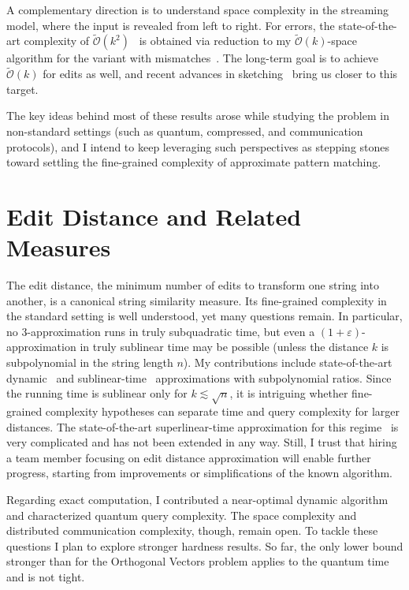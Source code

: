 \documentclass[a4paper,11pt]{article}
\newcommand{\eps}{\varepsilon}
\newcommand{\Ohtilde}{\tilde{\mathcal{O}}}
\begin{document}
A complementary direction is to understand space complexity in the streaming model, where the input is revealed from left to right. 
For errors, the state-of-the-art complexity of $\Ohtilde(k^2)$~\cite{BK23b} is obtained via reduction to my $\Ohtilde(k)$-space algorithm for the variant with mismatches~\cite{CKP19}. 
The long-term goal is to achieve $\Ohtilde(k)$ for edits as well, and recent advances in sketching~\cite{KS24} bring us closer to this target.  

The key ideas behind most of these results arose while studying the problem in non-standard settings (such as quantum, compressed, and communication protocols), and I intend to keep leveraging such perspectives as stepping stones toward settling the fine-grained complexity of approximate pattern matching.

\section{Edit Distance and Related Measures}

The edit distance, the minimum number of edits to transform one string into another, is a canonical string similarity measure. 
Its fine-grained complexity in the standard setting is well understood, yet many questions remain. 
In particular, no $3$-approximation runs in truly subquadratic time, but even a $(1+\eps)$-approximation in truly sublinear time may be possible (unless the distance $k$ is subpolynomial in the string length $n$). 
My contributions include state-of-the-art dynamic~\cite{KMS23} and sublinear-time~\cite{GKKS22} approximations with subpolynomial ratios. 
Since the running time is sublinear only for $k \lesssim \sqrt{n}$, it is intriguing whether fine-grained complexity hypotheses can separate time and query complexity for larger distances. 
The state-of-the-art superlinear-time approximation for this regime~\cite{AN20} is very complicated and has not been extended in any way.
Still, I trust that hiring a team member focusing on edit distance approximation will enable further progress, starting from improvements or simplifications of the known algorithm.

Regarding exact computation, I contributed a near-optimal dynamic algorithm~\cite{GK25} and characterized quantum query complexity. 
The space complexity and distributed communication complexity, though, remain open. 
To tackle these questions I plan to explore stronger hardness results. 
So far, the only lower bound stronger than for the Orthogonal Vectors problem applies to the quantum time~\cite{BPS21} and is not tight.  
\end{document}
